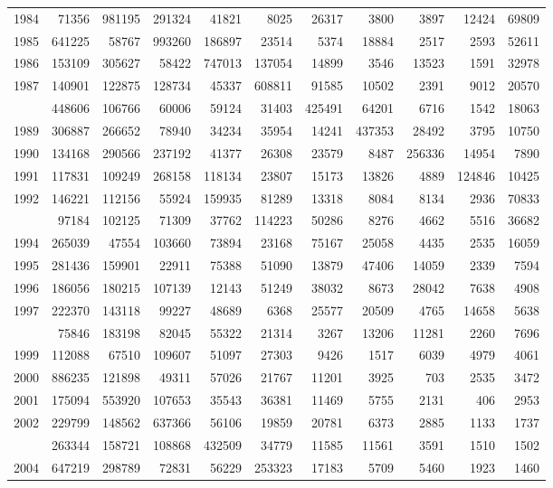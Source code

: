 \documentclass[
]{article}
\begin{document}
\begin{longtable}[t]{lrrrrrrrrrr}
1984 & 71356 & 981195 & 291324 & 41821 & 8025 & 26317 & 3800 & 3897 & 12424 & 69809\\
1985 & 641225 & 58767 & 993260 & 186897 & 23514 & 5374 & 18884 & 2517 & 2593 & 52611\\
1986 & 153109 & 305627 & 58422 & 747013 & 137054 & 14899 & 3546 & 13523 & 1591 & 32978\\
1987 & 140901 & 122875 & 128734 & 45337 & 608811 & 91585 & 10502 & 2391 & 9012 & 20570\\
\addlinespace
1988 & 448606 & 106766 & 60006 & 59124 & 31403 & 425491 & 64201 & 6716 & 1542 & 18063\\
1989 & 306887 & 266652 & 78940 & 34234 & 35954 & 14241 & 437353 & 28492 & 3795 & 10750\\
1990 & 134168 & 290566 & 237192 & 41377 & 26308 & 23579 & 8487 & 256336 & 14954 & 7890\\
1991 & 117831 & 109249 & 268158 & 118134 & 23807 & 15173 & 13826 & 4889 & 124846 & 10425\\
1992 & 146221 & 112156 & 55924 & 159935 & 81289 & 13318 & 8084 & 8134 & 2936 & 70833\\
\addlinespace
1993 & 97184 & 102125 & 71309 & 37762 & 114223 & 50286 & 8276 & 4662 & 5516 & 36682\\
1994 & 265039 & 47554 & 103660 & 73894 & 23168 & 75167 & 25058 & 4435 & 2535 & 16059\\
1995 & 281436 & 159901 & 22911 & 75388 & 51090 & 13879 & 47406 & 14059 & 2339 & 7594\\
1996 & 186056 & 180215 & 107139 & 12143 & 51249 & 38032 & 8673 & 28042 & 7638 & 4908\\
1997 & 222370 & 143118 & 99227 & 48689 & 6368 & 25577 & 20509 & 4765 & 14658 & 5638\\
\addlinespace
1998 & 75846 & 183198 & 82045 & 55322 & 21314 & 3267 & 13206 & 11281 & 2260 & 7696\\
1999 & 112088 & 67510 & 109607 & 51097 & 27303 & 9426 & 1517 & 6039 & 4979 & 4061\\
2000 & 886235 & 121898 & 49311 & 57026 & 21767 & 11201 & 3925 & 703 & 2535 & 3472\\
2001 & 175094 & 553920 & 107653 & 35543 & 36381 & 11469 & 5755 & 2131 & 406 & 2953\\
2002 & 229799 & 148562 & 637366 & 56106 & 19859 & 20781 & 6373 & 2885 & 1133 & 1737\\
\addlinespace
2003 & 263344 & 158721 & 108868 & 432509 & 34779 & 11585 & 11561 & 3591 & 1510 & 1502\\
2004 & 647219 & 298789 & 72831 & 56229 & 253323 & 17183 & 5709 & 5460 & 1923 & 1460\\

\end{longtable}
\end{document}
